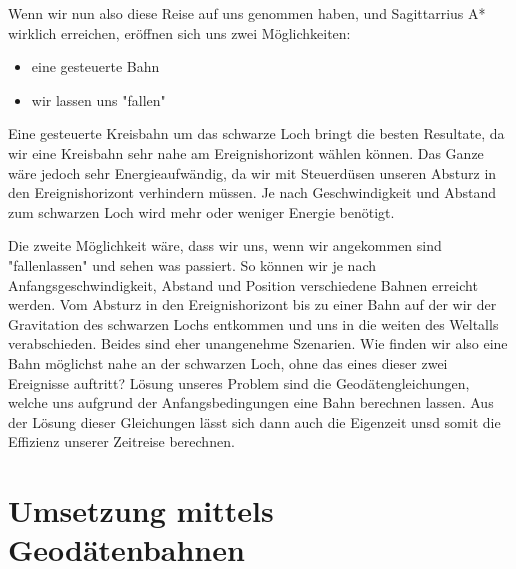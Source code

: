 \begin{refsection}
	Wenn wir nun also diese Reise auf uns genommen haben, und Sagittarrius A* wirklich erreichen, eröffnen sich uns zwei Möglichkeiten:
	\begin{itemize}
		\item eine gesteuerte Bahn
		\item wir lassen uns "fallen"
	\end{itemize}
	Eine gesteuerte Kreisbahn um das schwarze Loch bringt die besten Resultate, da wir eine Kreisbahn sehr nahe am Ereignishorizont wählen können. Das Ganze wäre jedoch sehr Energieaufwändig, da wir mit Steuerdüsen unseren Absturz in den Ereignishorizont verhindern müssen. Je nach Geschwindigkeit und Abstand zum schwarzen Loch wird mehr oder weniger Energie benötigt.
	
	Die zweite Möglichkeit wäre, dass wir uns, wenn wir angekommen sind "fallenlassen" und sehen was passiert. So können wir je nach Anfangsgeschwindigkeit, Abstand und Position verschiedene Bahnen erreicht werden. Vom Absturz in den Ereignishorizont bis zu einer Bahn auf der wir der Gravitation des schwarzen Lochs entkommen und uns in die weiten des Weltalls verabschieden. Beides sind eher unangenehme Szenarien. 
	Wie finden wir also eine Bahn möglichst nahe an der schwarzen Loch, ohne das eines dieser zwei Ereignisse auftritt?
	Lösung unseres Problem sind die Geodätengleichungen, welche uns aufgrund der Anfangsbedingungen eine Bahn berechnen lassen. Aus der Lösung dieser Gleichungen lässt sich dann auch die Eigenzeit unsd somit die Effizienz unserer Zeitreise berechnen.
	
	\section{Umsetzung mittels Geodätenbahnen}
	

\end{refsection}
